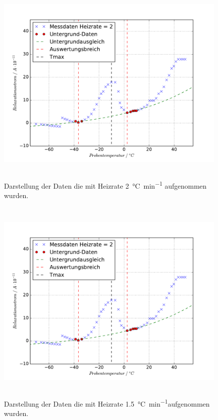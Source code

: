 \begin{figure}
  \centering
  \includegraphics[height = 10cm]{plots/M1UGplot.pdf}
  \caption{Darstellung der Daten die mit Heizrate \SI{2}{\celsius\per\minute} aufgenommen wurden.}
  \label{fig:U2plot}
\end{figure}
\begin{figure}
  \centering
  \includegraphics[height = 10cm]{plots/M1UGplot.pdf}
  \caption{Darstellung der Daten die mit Heizrate \SI{1.5}{\celsius\per\minute}aufgenommen wurden.}
  \label{fig:U15plot}
\end{figure}
\FloatBarrier
